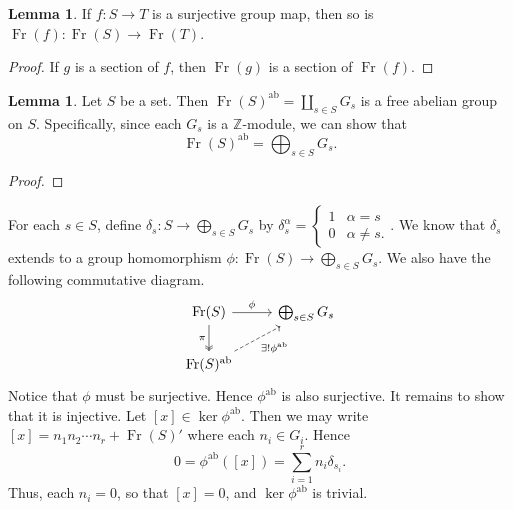 \documentclass[10pt,letterpaper,cm]{nupset}
\theoremstyle{definition}
\theoremstyle{theorem}
\newtheorem{lemma}[definition]{Lemma}
\theoremstyle{remark}
\newcommand{\Z}{\mathbb Z}
\newcommand{\1}{\mathbf{1}}
\newcommand{\0}{\vec 0}
\DeclareMathOperator{\ab}{ab}
\DeclareMathOperator{\Fr}{Fr}
\begin{document}
\begin{lemma}
If $f: S \to T$ is a surjective group map, then so is $\Fr(f) : \Fr(S) \to \Fr(T)$.
\end{lemma}
\begin{proof}
If $g$ is a section of $f$, then $\Fr(g)$ is a section of $\Fr(f)$.
\end{proof}

\begin{lemma}
Let $S$ be a set. Then $\Fr(S)^{\ab}= \coprod_{s\in S} G_s$ is a free abelian group on $S$. Specifically, since each $G_s$ is a $\Z$-module, we can show that $$\Fr(S)^{\ab} = \bigoplus_{s\in S} G_s.$$
\end{lemma}
\begin{proof}
\end{proof}
For each $s\in S$, define $\delta_s : S \to \bigoplus_{s\in S} G_s$ by $\delta_s^{\alpha} =  \begin{cases} 1 & \alpha = s \\ 0 & \alpha \ne s . \end{cases}$. We know that $\delta_s$ extends to a group  homomorphism $ \phi : \Fr(S) \to \bigoplus_{s\in S} G_s$. We also have the following commutative diagram.
\[
\begin{tikzcd}
\Fr(S) \arrow[d, "\pi"', two heads] \arrow[r, "\phi"] & \bigoplus_{s\in S} G_s \\
\Fr(S)^{\ab} \arrow[ru, "\exists! \phi^{\ab}"', dashed] & 
\end{tikzcd}
\]
Notice that $\phi$ must be surjective. Hence $\phi^{\ab}$ is also surjective. It remains to show that it is injective. Let $[x] \in \ker \phi^{\ab}$.
Then we may write $[x] = n_1n_2\cdots n_r+\Fr(S)'$ where each $n_i \in G_i$. Hence $$0= \phi^{\ab}([x]) = \sum_{i=1}^r n_i \delta_{s_i}.$$ Thus, each $n_i=0$, so that $[x]=0$, and $\ker \phi^{\ab}$ is trivial. 
\end{document}
